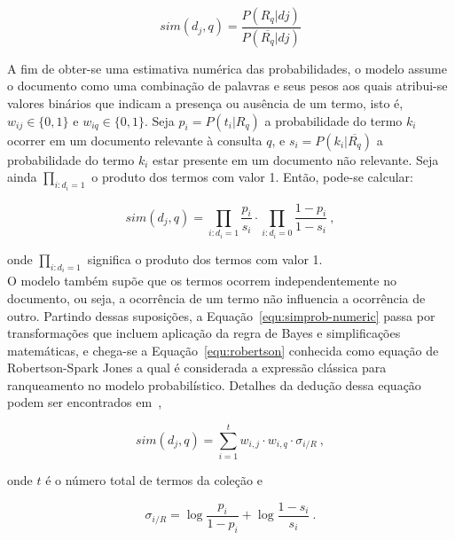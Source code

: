 \begin{equation}
	sim(d_j, q) = \frac{P(R_q|dj)}{P(\overline{R_q}|dj)} 
	\label{equ:simprob}
\end{equation}


A fim de obter-se uma estimativa numérica das probabilidades, o modelo assume o documento como uma combinação de palavras e seus pesos aos quais atribui-se valores binários que indicam a presença ou ausência de um termo, isto é, $w_{ij} \in \{0,1\}$ e $w_{iq} \in \{0,1\}$. Seja $p_i = P(t_i|R_q)$ a probabilidade do termo $k_i$ ocorrer em um documento relevante à consulta $q$, e $s_i    = P(k_i|\overline{R_q})$ a probabilidade do termo $k_i$ estar presente em um documento não relevante. 
Seja ainda $\prod_{i:d_i=1}$ o produto dos termos com valor 1. 
Então, pode-se calcular:

\begin{equation}
	sim(d_j, q) = 	
	\prod_{i:d_i=1} \frac{p_i}{s_i} 
	\cdot
	\prod_{i:d_i=0} \frac{1 - p_i}{1 - s_i}~,
	\label{equ:simprob-numeric}
\end{equation}


\noindent
onde $\prod_{i:d_i=1}$ significa o produto dos termos com valor 1.\\


%
%
O modelo também supõe que os termos ocorrem independentemente no documento, ou seja, a ocorrência de um termo não influencia a ocorrência de outro. 
Partindo dessas suposições, a Equação~\ref{equ:simprob-numeric} passa por transformações que incluem aplicação da regra de Bayes e simplificações matemáticas, e chega-se a Equação~\ref{equ:robertson} conhecida como equação de Robertson-Spark Jones a qual é considerada a expressão clássica para ranqueamento no modelo probabilístico. Detalhes da dedução dessa equação podem ser encontrados em~\cite{Croft2009, Manning2008, Rijsbergen1979},



\begin{equation}
	sim(d_j,q) = \sum_{i=1}^{t} w_{i,j} \cdot w_{i,q}  \cdot \sigma_{i/R}~,
	\label{equ:robertson}
\end{equation}



\noindent
onde $t$ é o número total de termos da coleção e 



\begin{equation}
	\sigma_{i/R} = \log \frac{p_i}{1-p_i} + \log \frac{1-s_i}{s_i}~.
\end{equation} 


